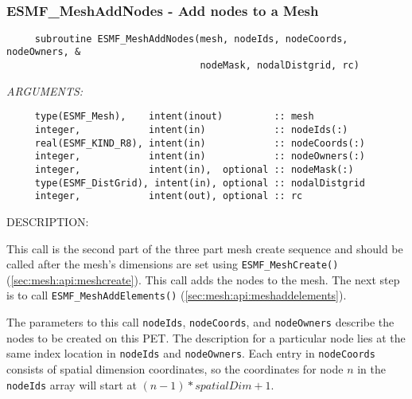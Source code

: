  
\mbox{}\hrulefill\ 
 
\subsubsection [ESMF\_MeshAddNodes] {ESMF\_MeshAddNodes - Add nodes to a Mesh \label{sec:mesh:api:meshaddnodes}}


  
\begin{verbatim}     subroutine ESMF_MeshAddNodes(mesh, nodeIds, nodeCoords, nodeOwners, &
                                  nodeMask, nodalDistgrid, rc)
 \end{verbatim}{\em ARGUMENTS:}
\begin{verbatim}     type(ESMF_Mesh),    intent(inout)         :: mesh
     integer,            intent(in)            :: nodeIds(:)
     real(ESMF_KIND_R8), intent(in)            :: nodeCoords(:)
     integer,            intent(in)            :: nodeOwners(:)
     integer,            intent(in),  optional :: nodeMask(:)
     type(ESMF_DistGrid), intent(in), optional :: nodalDistgrid
     integer,            intent(out), optional :: rc\end{verbatim}
{\sf DESCRIPTION:\\ }


     This call is the second part of the three part mesh create
     sequence and should be called after the mesh's dimensions are set
     using {\tt ESMF\_MeshCreate()} (\ref{sec:mesh:api:meshcreate}).
     This call adds the nodes to the
     mesh. The next step is to call {\tt ESMF\_MeshAddElements()} (\ref{sec:mesh:api:meshaddelements}).
  
     The parameters to this call {\tt nodeIds}, {\tt nodeCoords}, and
     {\tt nodeOwners} describe the nodes to be created on this PET.
     The description for a particular node lies at the same index location in
     {\tt nodeIds} and {\tt nodeOwners}. Each entry
     in {\tt nodeCoords} consists of spatial dimension coordinates, so the coordinates
     for node $n$ in the {\tt nodeIds} array will start at $(n-1)*spatialDim+1$.
  
